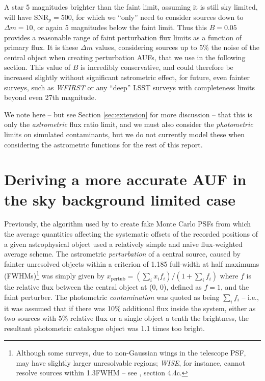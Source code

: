 \documentclass[fleqn,usenatbib]{mnras}
\begin{document}
A star 5 magnitudes brighter than the faint limit, assuming it is still sky limited, will have
$\mathrm{SNR}_p = 500$, for which we ``only'' need to consider sources down to $\Delta m = 10$, or again 5 magnitudes below the faint limit.  Thus this $B=0.05$ provides a reasonable range of faint perturbation flux limits as a function of primary flux. It is these $\Delta m$ values, considering sources up to 5\% the noise of the central object when creating perturbation AUFs, that we use in the following section. This value of $B$ is incredibly conservative, and could therefore be increased slightly without significant astrometric effect, for future, even fainter surveys, such as \textit{WFIRST} or any ``deep'' LSST surveys with completeness limits beyond even 27th magnitude.

We note here -- but see Section \ref{sec:extension} for more discussion -- that this is only the \textit{astrometric} flux ratio limit, and we must also consider the \textit{photometric} limits on simulated contaminants, but we do not currently model these when considering the astrometric functions for the rest of this report.

\section{Deriving a more accurate AUF in the sky background limited case}
\label{sec:loglfit}
Previously, the algorithm used by \cite{2018MNRAS.481.2148W} to create fake Monte Carlo PSFs from which the average quantities affecting the systematic offsets of the recorded positions of a given astrophysical object used a relatively simple and naive flux-weighted average scheme. The astrometric \textit{perturbation} of a central source, caused by fainter unresolved objects within a \citet{1880MNRAS..40..254R} criterion of 1.185 full-width at half maximums (FWHMs)\footnote{Although some surveys, due to non-Gaussian wings in the telescope PSF, may have slightly larger unresolvable regions; \textit{WISE}, for instance, cannot resolve sources within 1.3FWHM -- see \citet{Cutri:2012aa}, section 4.4c.} was simply given by $x_\mathrm{pertub} = (\sum_i x_i f_i) / (1 + \sum_i f_i)$ where $f$ is the relative flux between the central object at (0, 0), defined as $f=1$, and the faint perturber. The photometric \textit{contamination} was quoted as being $\sum_i f_i$ -- i.e., it was assumed that if there was 10\% additional flux inside the system, either as two sources with 5\% relative flux or a single object a tenth the brightness, the resultant photometric catalogue object was 1.1 times too bright.
\end{document}
